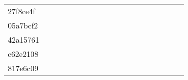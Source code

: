 \begin{table*}[htb]
\begin{tabular}{l|cccccccccccccccccc}
27f8ce4f  & \C & \X & \X & \X & \X & \X & \X & \X & \X & \X & \X & \X & \X & \C & \C & \C & \X \\
05a7bcf2  & \X & \X & \X & \X & \X & \X & \X & \X & \X & \X & \X & \X & \X & \X & \X & \X & \X \\
42a15761  & \C & \X & \X & \X & \X & \X & \X & \X & \X & \X & \X & \X & \X & \C & \C & \X & \X \\
c62e2108  & \C & \X & \X & \X & \X & \X & \X & \X & \X & \X & \X & \X & \X & \C & \C & \X & \X \\
817e6c09  & \C & \X & \X & \X & \X & \X & \X & \X & \X & \X & \X & \X & \X & \C & \C & \C & \C \\
\bottomrule
\end{tabular}
\label{tab:arc400eval2}
\end{table*}

\newpage
\clearpage

